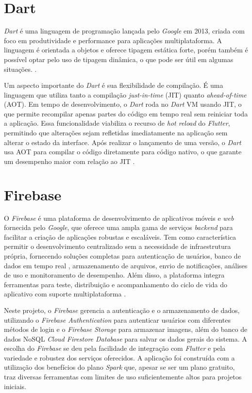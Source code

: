 \section{Dart}

\textit{Dart} é uma linguagem de programação lançada pelo \textit{Google} em 2013, criada com foco em produtividade e 
performance para aplicações multiplataforma. A linguagem é orientada a objetos e oferece tipagem 
estática forte, porém também é possível optar pelo uso de tipagem dinâmica, 
o que pode ser útil em algumas situações. \cite{dartDocs2025}.

Um aspecto importante do \textit{Dart} é sua flexibilidade de compilação. 
É uma linguagem que utiliza tanto a compilação \textit{just-in-time} 
(JIT) quanto \textit{ahead-of-time} (AOT). 
Em tempo de desenvolvimento, o \textit{Dart} roda no \textit{Dart} VM 
usando JIT, o que permite recompilar apenas partes 
do código em tempo real sem reiniciar toda a aplicação. Essa funcionalidade 
viabiliza o recurso de \textit{hot reload} do \textit{Flutter}, permitindo 
que alterações sejam refletidas imediatamente na aplicação sem alterar o 
estado da interface.
Após realizar o lançamento de uma versão, o \textit{Dart} usa AOT para compilar o código diretamente 
para código nativo, o que garante um desempenho maior com relação ao JIT \cite{dartDocs2025}.

\section{Firebase}

O \textit{Firebase} é uma plataforma de desenvolvimento de aplicativos móveis e \textit{web} 
fornecida pelo \textit{Google}, que oferece uma ampla gama de serviços \textit{backend} para 
facilitar a criação de aplicações robustas e escaláveis. Tem como característica 
permitir o desenvolvimento centralizado sem a necessidade de infraestrutura própria, 
fornecendo soluções completas para autenticação de usuários, banco de dados em tempo real
, armazenamento de arquivos, envio de notificações, análises de uso e monitoramento de 
desempenho. Além disso, a plataforma integra ferramentas para teste, distribuição 
e acompanhamento do ciclo de vida do aplicativo com suporte multiplataforma \cite{firebase2025}.

Neste projeto, o \textit{Firebase} gerencia a autenticação e o armazenamento de 
dados, utilizando o \textit{Firebase Authentication} para autenticar usuários com diferentes métodos de login e 
o \textit{Firebase Storage} para armazenar imagens, além do banco de dados NoSQL \textit{Cloud Firestore Database} para salvar os dados gerais do sistema.
A escolha do \textit{Firebase} se deu pela facilidade de integração com \textit{Flutter} e pela variedade e robustez dos 
serviços oferecidos. A aplicação foi construída com a utilização dos benefícios do plano \textit{Spark} 
que, apesar se ser um plano gratuito, traz diversas ferramentas com limites de uso suficientemente 
altos para projetos iniciais.

